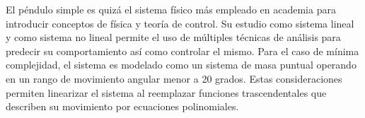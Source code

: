 El péndulo simple es quizá el sistema físico más empleado en 
academia para introducir conceptos de física y teoría de control.
Su estudio como sistema lineal y como sistema no lineal permite el
uso de múltiples técnicas de análisis para predecir su comportamiento
así como controlar el mismo. Para el caso de mínima complejidad, 
el sistema es modelado como un sistema de masa puntual 
operando en un rango de movimiento angular menor a 20 grados.
Estas consideraciones permiten linearizar el sistema al 
reemplazar funciones trascendentales que describen 
su movimiento por ecuaciones polinomiales.





